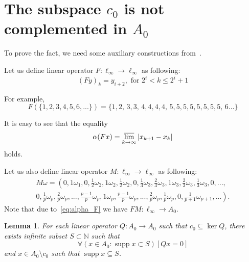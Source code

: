 \documentclass[a4paper,14pt]{article} %
\DeclareMathOperator{\supp}{supp}
\theoremstyle{plain}
\newtheorem{lemma}[theorem]{Lemma}
\theoremstyle{definition}
\begin{document}
\section{The subspace $c_0$ is not complemented in $A_0$}
\label{sec:c0_in_A0}

To prove the fact, we need some auxiliary constructions from~\cite{our-vzms-2018}.


Let us define linear operator $F:\ell_\infty \to \ell_\infty$ as following:
\begin{equation}
	\label{operator_F}
	(Fy)_k = y_{i+2}, \mbox{ for } 2^i < k \leq 2^i+1
\end{equation}

For example,
$$
	F(\{1,2,3,4,5,6, ...\}) = \{1,2,\,3,3,\,4,4,4,4,\,5,5,5,5,5,5,5,5,\,6...\}
$$


It is easy to see that the equality
\begin{equation}
	\label{eq:alpha_F}
	\alpha(Fx) = \varlimsup_{k\to\infty} |x_{k+1} - x_{k}|
\end{equation}
holds.

Let us also define linear operator $M:\ell_\infty \to \ell_\infty$ as following:
\begin{multline*}
	M\omega=\left(
		0, 1\omega_1,
		0, \frac{1}{2}\omega_2, 1\omega_2, \frac{1}{2}\omega_2,
		0, \frac{1}{3}\omega_3, \frac{2}{3}\omega_3, 1\omega_3, \frac{2}{3}\omega_3, \frac{1}{3}\omega_3,
		0, ...,
	\right. \\ \left.
		0, \frac{1}{p}\omega_p, \frac{2}{p}\omega_p, ..., \frac{p-1}{p}\omega_p, 1\omega_p,
			\frac{p-1}{p}\omega_p, ..., \frac{2}{p}\omega_p, \frac{1}{p}\omega_p,
		0, \frac{1}{p+1}\omega_{p+1}, ...
	\right)
	.
\end{multline*}
Note that due to~\eqref{eq:alpha_F} we have $FM: \ell_\infty \to A_0$.


\begin{lemma}
	\label{lem:c_0_not_complemented_in_A_0}
	For each linear operator $Q: A_0 \to A_0$ such that $c_0\subseteq \ker Q$,
	there exists infinite subset $S \subset \mathbb{N}$ such that
	\begin{equation}
		\forall(x \in A_0 : \supp x \subset S)[Qx = 0]
	\end{equation}
	and $x\in A_0\setminus c_0$ such that $\supp x \subseteq S$.
\end{lemma}
\end{document}
